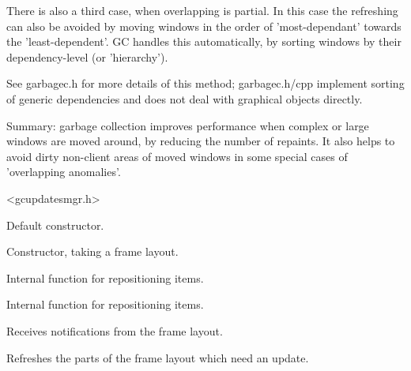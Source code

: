 There is also a third case, when overlapping is partial.
In this case the refreshing can also be avoided by
moving windows in the order of 'most-dependant' towards the
'least-dependent'. GC handles this automatically, by
sorting windows by their dependency-level (or 'hierarchy').

See garbagec.h for more details of this method; garbagec.h/cpp
implement sorting of generic dependencies and does not deal
with graphical objects directly.

Summary: garbage collection improves performance when complex or large
windows are moved around, by reducing the number of repaints. It also helps
to avoid dirty non-client areas of moved windows
in some special cases of 'overlapping anomalies'.




<gcupdatesmgr.h>




\label{cbgcupdatesmgrcbgcupdatesmgr}


Default constructor.



Constructor, taking a frame layout.


\label{cbgcupdatesmgradditem}


Internal function for repositioning items.


\label{cbgcupdatesmgrdorepositionitems}


Internal function for repositioning items.


\label{cbgcupdatesmgronstartchanges}


Receives notifications from the frame layout.


\label{cbgcupdatesmgrupdatenow}


Refreshes the parts of the frame layout which need an update.

